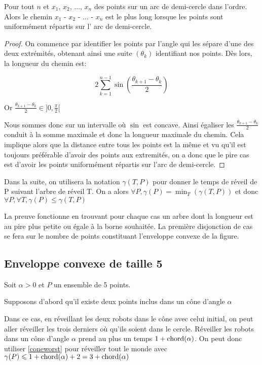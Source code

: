 \begin{lemma}\label{worstchord}
Pour tout $n$ et $x_1$, $x_2$, ..., $x_n$ des points sur un arc de demi-cercle dans l'ordre. Alors le chemin $x_1$ - $x_2$ - ... - $x_n$ est le plus long lorsque les points sont uniformément répartis sur l' arc de demi-cercle.
\end{lemma}
\begin{proof}
On commence par identifier les points par l'angle qui les sépare d'une des deux extrémités, obtenant ainsi une suite $\left(\theta_k\right)$ identifiant nos points. Dès lors, la longueur du chemin est:

$$2\sum_{k=1}^{n-1} \sin\left(\frac{\theta_{k+1} - \theta_k}{2}\right)$$

Or $\frac{\theta_{k+1} - \theta_k}{2} \in ]0, \frac{\pi}{2}[$

Nous sommes donc sur un intervalle où $\sin$ est concave. Ainsi égaliser les $\frac{\theta_{k+1} - \theta_k}{2}$ conduit à la somme maximale et donc la longueur maximale du chemin. 
Cela implique alors que la distance entre tous les points est la même et vu qu'il est toujours préférable d'avoir des points aux extremités, on a donc que le pire cas est d'avoir les points uniformément répartis sur l'arc de demi-cercle.

\end{proof}

Dans la suite, on utilisera la notation $\gamma(T, P)$ pour donner le temps de réveil de P suivant l'arbre de réveil T.
On a alors $\forall P, \gamma(P) = \min_T(\gamma(T,P))$
et donc $\forall P, \forall T, \gamma(P) \leq \gamma(T, P)$

La preuve fonctionne en trouvant pour chaque cas un arbre dont la longueur est au pire plus petite ou égale à la borne souhaitée. La première disjonction de cas se fera sur le nombre de points constituant l'enveloppe convexe de la figure.

\subsection{Enveloppe convexe de taille 5}\label{conv5}

Soit $\alpha > 0$ et $P$ un ensemble de 5 points.

\begin{lemma}\label{conealphachord}
Supposons d'abord qu'il existe deux points inclus dans un cône d'angle $\alpha$

Dans ce cas, en réveillant les deux robots dans le cône avec celui initial, on peut aller réveiller les trois derniers où qu'ils soient dans le cercle. Réveiller les robots dans un cône d'angle $\alpha$ prend au plus un temps $1 + \operatorname{chord}(\alpha)$.
On peut donc utiliser \cref{coneworst} pour réveiller tout le monde avec $\gamma(P) \leqslant 1 + \operatorname{chord}(\alpha) + 2 = 3 + \operatorname{chord}(\alpha)$
\end{lemma}

